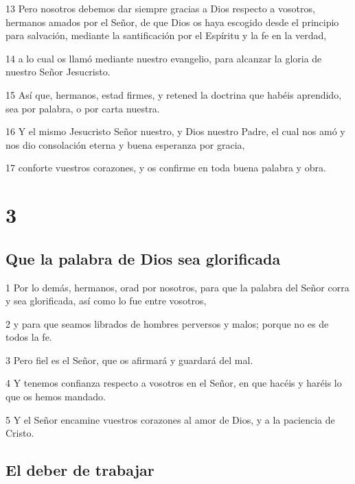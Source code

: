 \par 13 Pero nosotros debemos dar siempre gracias a Dios respecto a vosotros, hermanos amados por el Señor, de que Dios os haya escogido desde el principio para salvación, mediante la santificación por el Espíritu y la fe en la verdad,
\par 14 a lo cual os llamó mediante nuestro evangelio, para alcanzar la gloria de nuestro Señor Jesucristo.
\par 15 Así que, hermanos, estad firmes, y retened la doctrina que habéis aprendido, sea por palabra, o por carta nuestra.
\par 16 Y el mismo Jesucristo Señor nuestro, y Dios nuestro Padre, el cual nos amó y nos dio consolación eterna y buena esperanza por gracia,
\par 17 conforte vuestros corazones, y os confirme en toda buena palabra y obra.

\chapter{3}

\section*{Que la palabra de Dios sea glorificada}

\par 1 Por lo demás, hermanos, orad por nosotros, para que la palabra del Señor corra y sea glorificada, así como lo fue entre vosotros,
\par 2 y para que seamos librados de hombres perversos y malos; porque no es de todos la fe.
\par 3 Pero fiel es el Señor, que os afirmará y guardará del mal.
\par 4 Y tenemos confianza respecto a vosotros en el Señor, en que hacéis y haréis lo que os hemos mandado.
\par 5 Y el Señor encamine vuestros corazones al amor de Dios, y a la paciencia de Cristo.

\section*{El deber de trabajar}

